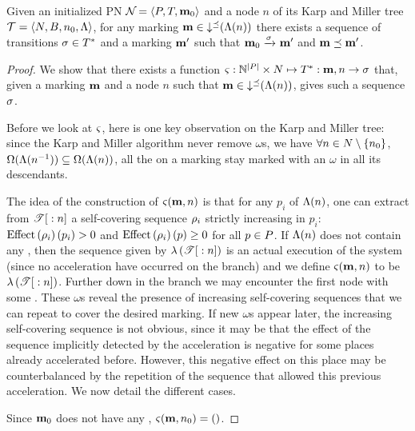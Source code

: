 \begin{lemm}
  \label{theo:km-correctness}
  Given an initialized \ac{PN} $\defPN$ and a node $n$ of its Karp and Miller tree $\mathcal{T} = \left\langle N, B, n_0, \operatorname{\Lambda}\right\rangle$,
  for any marking $\mathbf{m} \in \operatorname{\downarrow^\preceq}(\operatorname{\Lambda}(n))$ there exists a sequence of transitions $\seqt \in \transitions^*$ and a marking $\mathbf{m}'$ such that $\mari \fire{\seqt} \mar'$ and $\mathbf{m} \preceq \mathbf{m}'$.
\end{lemm}

\begin{proof}
  We show that there exists a function $\Tts : \naturals^{\card{\places}} \times \nodes \mapsto \transitions^* : \mar, n \rightarrow \seqt$ that, given a marking $\mathbf{m}$ and a node $n$ such that $\mathbf{m} \in \operatorname{\downarrow^\preceq}(\operatorname{\Lambda}(n))$, gives such a sequence $\seqt$.

  Before we look at $\operatorname{\varsigma}$, here is one key observation on the Karp and Miller tree:
  since the Karp and Miller algorithm never remove $\omega$s, we have
  $\forall n \in N \setminus \{n_0\}$, $\operatorname{\Omega}(\operatorname{\Lambda}(n^{-1})) \subseteq \operatorname{\Omega}(\operatorname{\Lambda}(n))$,
   all the \oplaces on a marking stay marked with an $\omega$ in all its descendants.

  The idea of the construction of $\operatorname{\varsigma}(\mathbf{m},n)$ is that for any \oplace $p_i$ of $\operatorname{\Lambda}(n)$, one can extract from ${\mathscr{T}}[{}:{n}]$ a self-covering sequence $\iscs{i}$ strictly increasing in $p_i$:
  $\effect{\iscs{i}}(p_i) > 0$ and $\effect{\iscs{i}}(p) \geq 0$ for all $p \in P$.
  If $\operatorname{\Lambda}(n)$ does not contain any \oplace, then the sequence given by $\operatorname{\lambda}\left({{\mathscr{T}}[{}:{n}]}\right)$ is an actual execution of the system (since no acceleration have occurred on the branch) and we define $\operatorname{\varsigma}(\mathbf{m},n)$ to be $\operatorname{\lambda}\left({{\mathscr{T}}[{}:{n}]}\right)$.
  Further down in the branch we may encounter the first node with some \oplaces.
  These $\omega$s reveal the presence of increasing self-covering sequences that we can repeat to cover the desired marking.
  If new $\omega$s appear later, the  increasing self-covering sequence is not obvious, since it may be that the effect of the sequence implicitly detected by the acceleration is negative for some places already accelerated before.
  However, this negative effect on this place may be counterbalanced by the repetition of the sequence that allowed this previous acceleration.
  We now detail the different cases.

  Since $\mathbf{m}_0$ does not have any \oplace, $\operatorname{\varsigma}(\mathbf{m},n_0) = ()$.


\end{proof}
